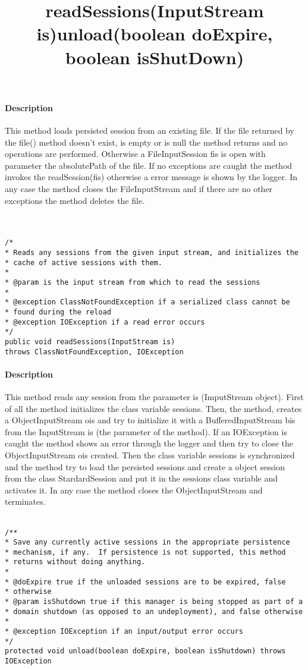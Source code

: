 \paragraph{Description} This method loads persisted session from an existing file. If the file returned by the file() method doesn't exist, is empty or is null the method returns and no operations are performed. Otherwise a FileInputSession fis is open with parameter the absolutePath of the file. If no exceptions are caught the method invokes the readSession(fis) otherwise a error message is shown by the logger. In any case the method closes the FileInputStream and if there are no other exceptions the method deletes the file.\\\\\\


\title{{\large \textbf{readSessions(InputStream is)}}}
\lstset{firstnumber=509}
\begin{lstlisting}
/*
* Reads any sessions from the given input stream, and initializes the
* cache of active sessions with them.
*
* @param is the input stream from which to read the sessions
*
* @exception ClassNotFoundException if a serialized class cannot be
* found during the reload
* @exception IOException if a read error occurs
*/
public void readSessions(InputStream is)
throws ClassNotFoundException, IOException
\end{lstlisting}

\paragraph{Description} This method reads any session from the parameter is (ImputStream object). First of all the method initializes the class variable sessions. Then, the method, creates a ObjectInputStream ois and try to initialize it with a BufferedInputStream bis from the InputStream is (the parameter of the method). If an IOException is caught the method shows an error through the logger and then try to close the ObjectInputStream ois created. Then the class variable sessions is synchronized and the method try to load the persisted sessions and create a object session from the class StardardSession and put it in the sessions class variable and activates it. In any case the method closes the ObjectInputStream and terminates.\\\\


\title{{\large \textbf{unload(boolean doExpire, boolean isShutDown)}}}
\lstset{firstnumber=626}
\begin{lstlisting}
/**
* Save any currently active sessions in the appropriate persistence
* mechanism, if any.  If persistence is not supported, this method
* returns without doing anything.
*
* @doExpire true if the unloaded sessions are to be expired, false
* otherwise
* @param isShutdown true if this manager is being stopped as part of a
* domain shutdown (as opposed to an undeployment), and false otherwise
*
* @exception IOException if an input/output error occurs
*/
protected void unload(boolean doExpire, boolean isShutdown) throws IOException
\end{lstlisting}
